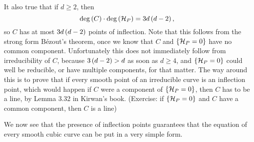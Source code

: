 \begin{remark}
\label{rem:13.6}
It also true that if $ d \ge 2 $, then
$$ \deg\left( C \right) \cdot \deg\left( \mathcal{H}_P \right) = 3d\left( d - 2 \right), $$
so $ C $ has at most $ 3d\left( d - 2 \right) $ points of inflection. Note that this follows from the strong form B\'ezout's theorem, once we know that $ C $ and $ \left\{ \mathcal{H}_P = 0 \right\} $ have no common component. Unfortunately this does not immediately follow from irreducibility of $ C $, because $ 3\left( d - 2 \right) > d $ as soon as $ d \ge 4 $, and $ \left\{ \mathcal{H}_P = 0 \right\} $ could well be reducible, or have multiple components, for that matter. The way around this is to prove that if every smooth point of an irreducible curve is an inflection point, which would happen if $ C $ were a component of $ \left\{ \mathcal{H}_P = 0 \right\} $, then $ C $ has to be a line, by Lemma 3.32 in Kirwan's book. (Exercise: if $ \left\{ \mathcal{H}_P = 0 \right\} $ and $ C $ have a common component, then $ C $ is a line)
\end{remark}

We now see that the presence of inflection points guarantees that the equation of every smooth cubic curve can be put in a very simple form.


